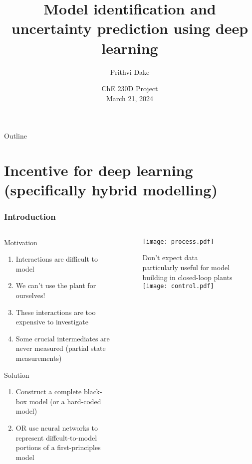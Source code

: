 \documentclass[dvipsnames, 9pt]{beamer}
\title[Model identification]{Model identification and uncertainty prediction using deep learning}
\author[ChE230D---Dake]{Prithvi Dake}
\institute [UCSB]{Department of Chemical
  Engineering\\
    \pgfuseimage{ucsb-logo}}
\date{ChE 230D Project \\
March 21, 2024}
\begin{document}
\frame{\titlepage}




\begin{frame}{Outline} 
\tableofcontents
\end{frame}

\section{Incentive for deep learning (specifically hybrid modelling)}
\begin{frame}
    \frametitle{Introduction}
    
    \begin{columns}
    {   \begin{column}{0.45\textwidth}
        \begin{block}{Motivation}
        \begin{enumerate}
        \item Interactions are difficult to model
        \item We can't use the plant for ourselves!
        \item These interactions are too expensive to investigate
        \item Some crucial intermediates are never measured (partial state measurements)
        \end{enumerate}
\end{block}
\begin{block}{Solution}
\begin{enumerate}
\item Construct a complete black-box model (or a hard-coded model)
\item OR use neural networks to represent diffcult-to-model portions of a first-principles model
\end{enumerate}
\end{block}
        \end{column}}
        \begin{column}{0.55\textwidth}
            \begin{figure}

\texttt{[image: process.pdf]}

Don't expect data particularly useful for model building in closed-loop plants
\texttt{[image: control.pdf]}
 \end{figure}
        \end{column}
    \end{columns}
\end{frame}
\end{document}
